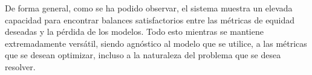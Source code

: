 De forma general, como se ha podido observar, el sistema muestra un elevada capacidad para encontrar balances satisfactorios entre las métricas de equidad deseadas y la pérdida de los modelos.
Todo esto mientras se mantiene extremadamente versátil, siendo agnóstico al modelo que se utilice, a las métricas que se desean optimizar, incluso a la naturaleza del problema que se desea resolver.
